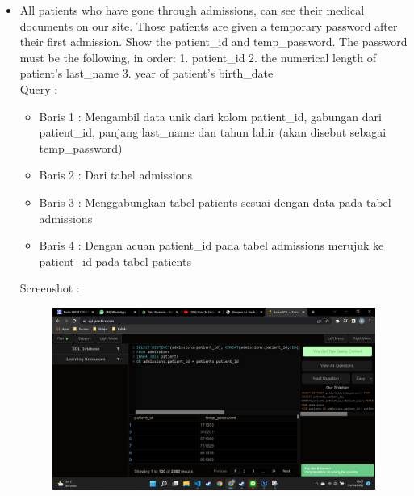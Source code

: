 \documentclass[]{article}
\begin{document}
\begin{itemize}
        \item All patients who have gone through admissions, can see their medical documents on our site. Those patients are given a temporary password after their first admission. Show the patient\_id and temp\_password.
        The password must be the following, in order:
            1. patient\_id
            2. the numerical length of patient's last\_name
            3. year of patient's birth\_date
        \\Query :
        
        \begin{itemize}
            \item Baris 1 : Mengambil data unik dari kolom patient\_id, gabungan dari patient\_id, panjang last\_name dan tahun lahir (akan disebut sebagai temp\_password)
            \item Baris 2 : Dari tabel admissions
            \item Baris 3 : Menggabungkan tabel patients sesuai dengan data pada tabel admissions
            \item Baris 4 : Dengan acuan patient\_id pada tabel admissions merujuk ke patient\_id pada tabel patients
        \end{itemize}
        \pagebreak
        Screenshot :
        \begin{figure}[h]
            \includegraphics[scale=0.3]{./Screenshot/Hard-4.png}
            \centering
        \end{figure}


\end{itemize}
\end{document}
